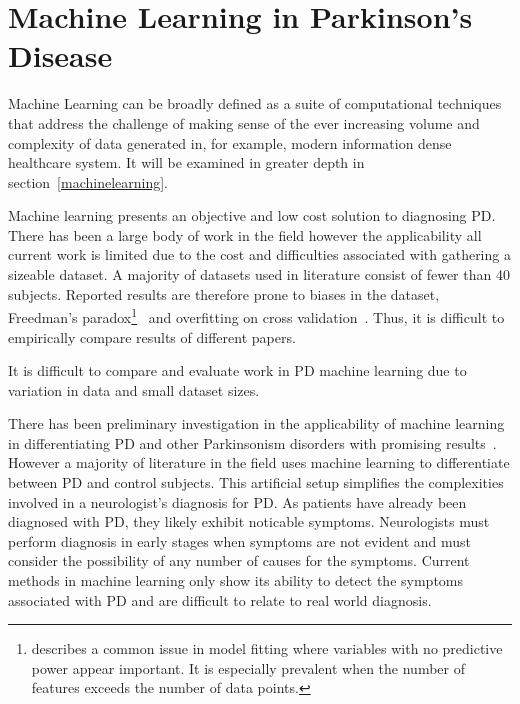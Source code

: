 \documentclass[12pt, twoside]{book}
\renewcommand\emph[1]{\textit{\color{USred}{#1}}}
\begin{document}
\section{Machine Learning in Parkinson's Disease}
Machine Learning can be broadly defined as a suite of computational techniques that address the challenge of making sense of the ever increasing volume and complexity of data generated in, for example, modern information dense healthcare system. It will be examined in greater depth in section~\ref{machinelearning}.

Machine learning presents an objective and low cost solution to diagnosing PD. There has been a large body of work in the field however the applicability all current work is limited due to the cost and difficulties associated with gathering a sizeable dataset. A majority of datasets used in literature consist of fewer than 40 subjects. Reported results are therefore prone to biases in the dataset, Freedman's paradox\footnote{\emph{Freedman's paradox} describes a common issue in model fitting where variables with no predictive power appear important. It is especially prevalent when the number of features exceeds the number of data points.}~\cite{freedmanparadox} and overfitting on cross validation~\cite{overfittingcv}. Thus, it is difficult to empirically compare results of different papers.


\begin{highlight}
It is difficult to compare and evaluate work in PD machine learning due to variation in data and small dataset sizes.
\end{highlight}

There has been preliminary investigation in the applicability of machine learning in differentiating PD and other Parkinsonism disorders with promising results~\cite{esser2011assessment, PDessentialtremordifferentiation}. However a majority of literature in the field uses machine learning to differentiate between PD and control subjects. This artificial setup simplifies the complexities involved in a neurologist's diagnosis for PD. As patients have already been diagnosed with PD, they likely exhibit noticable symptoms. Neurologists must perform diagnosis in early stages when symptoms are not evident and must consider the possibility of any number of causes for the symptoms. Current methods in machine learning only show its ability to detect the symptoms associated with PD and are difficult to relate to real world diagnosis. 
\end{document}
